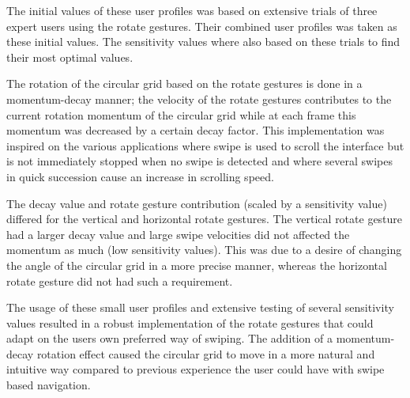 The initial values of these user profiles was based on extensive trials
of three expert users using the rotate gestures. Their combined user
profiles was taken as these initial values. The sensitivity values
where also based on these trials to find their most optimal values.

The rotation of the circular grid based on the rotate gestures is
done in a momentum-decay manner; the velocity of the rotate gestures
contributes to the current rotation momentum of the circular grid
while at each frame this momentum was decreased by a certain decay
factor. This implementation was inspired on the various applications
where swipe is used to scroll the interface but is not immediately
stopped when no swipe is detected and where several swipes in quick
succession cause an increase in scrolling speed. 

The decay value and rotate gesture contribution (scaled by a sensitivity
value) differed for the vertical and horizontal rotate gestures. The
vertical rotate gesture had a larger decay value and large swipe velocities
did not affected the momentum as much (low sensitivity values). This
was due to a desire of changing the angle of the circular grid in
a more precise manner, whereas the horizontal rotate gesture did not
had such a requirement.

The usage of these small user profiles and extensive testing of several
sensitivity values resulted in a robust implementation of the rotate
gestures that could adapt on the users own preferred way of swiping.
The addition of a momentum-decay rotation effect caused the circular
grid to move in a more natural and intuitive way compared to previous
experience the user could have with swipe based navigation.
